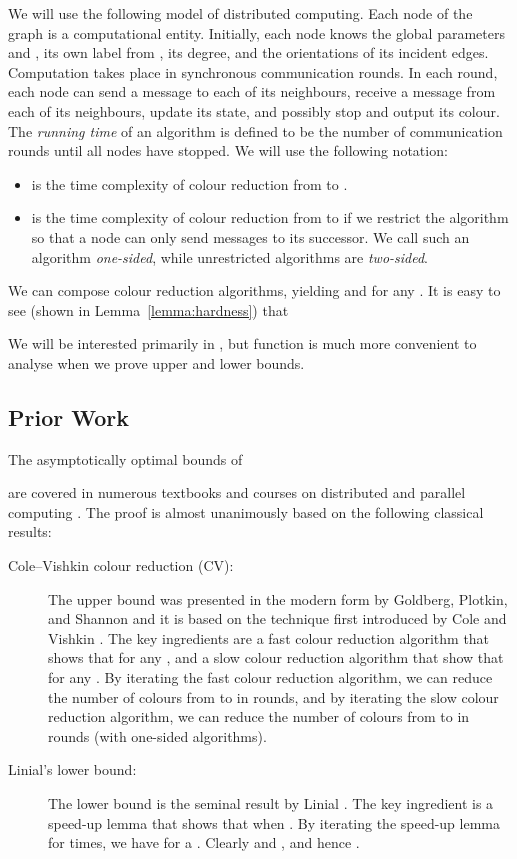 \documentclass[a4paper,11pt]{article}
\theoremstyle{remark}
\begin{document}
We will use the following model of distributed computing. Each node of the graph is a computational entity. Initially, each node knows the global parameters  and , its own label from , its degree, and the orientations of its incident edges. Computation takes place in synchronous communication rounds. In each round, each node can send a message to each of its neighbours, receive a message from each of its neighbours, update its state, and possibly stop and output its colour. The \emph{running time} of an algorithm is defined to be the number of communication rounds until all nodes have stopped. We will use the following notation:
\begin{itemize}
    \item  is the time complexity of colour reduction from  to .
    \item  is the time complexity of colour reduction from  to  if we restrict the algorithm so that a node can only send messages to its successor. We call such an algorithm \emph{one-sided}, while unrestricted algorithms are \emph{two-sided}.
\end{itemize}
We can compose colour reduction algorithms, yielding  and  for any . It is easy to see (shown in Lemma~\ref{lemma:hardness}) that

We will be interested primarily in , but function  is much more convenient to analyse when we prove upper and lower bounds.


\subsection{Prior Work}

The asymptotically optimal bounds of

are covered in numerous textbooks and courses on distributed and parallel computing \cite{cormen90introduction,peleg00distributed,barenboim13distributed,wattenhofer13lecture,suomela-dabook}. The proof is almost unanimously based on the following classical results:
\begin{description}
    \item[Cole--Vishkin colour reduction (CV):] The upper bound was presented in the modern form by Goldberg, Plotkin, and Shannon \cite{goldberg88parallel} and it is based on the technique first introduced by Cole and Vishkin \cite{cole86deterministic}. The key ingredients are a fast colour reduction algorithm that shows that  for any , and a slow colour reduction algorithm that show that  for any . By iterating the fast colour reduction algorithm, we can reduce the number of colours from  to  in  rounds, and by iterating the slow colour reduction algorithm, we can reduce the number of colours from  to  in  rounds (with one-sided algorithms).
    \item[Linial's lower bound:] The lower bound is the seminal result by Linial \cite{linial92locality}. The key ingredient is a speed-up lemma that shows that  when . By iterating the speed-up lemma for  times, we have  for a . Clearly  and , and hence .
\end{description}
\end{document}
